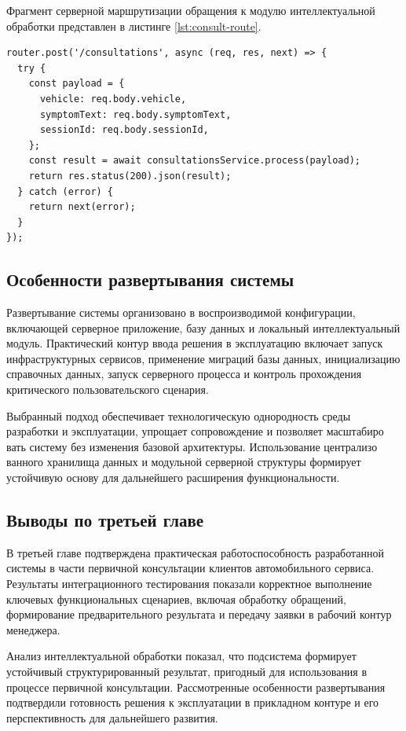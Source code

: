 \documentclass[14pt,a4paper]{extarticle}
\numberwithin{figure}{section}
\numberwithin{table}{section}
\begin{document}
Фрагмент серверной маршрутизации обращения к модулю интеллектуальной
обработки представлен в листинге \ref{lst:consult-route}.

\begin{lstlisting}[caption={Маршрут обработки запроса первичной консультации},label={lst:consult-route}]
router.post('/consultations', async (req, res, next) => {
  try {
    const payload = {
      vehicle: req.body.vehicle,
      symptomText: req.body.symptomText,
      sessionId: req.body.sessionId,
    };
    const result = await consultationsService.process(payload);
    return res.status(200).json(result);
  } catch (error) {
    return next(error);
  }
});
\end{lstlisting}

\subsection{Особенности развертывания
системы}\label{sec:chapter3-deploy}

Развертывание системы организовано в воспроизводимой конфигурации,
включающей серверное приложение, базу данных и локальный интеллектуальный
модуль. Практический контур ввода решения в эксплуатацию включает запуск
инфраструктурных сервисов, применение миграций базы данных, инициализацию
справочных данных, запуск серверного процесса и контроль прохождения
критического пользовательского сценария.

Выбранный подход обеспечивает технологическую однородность среды
разработки и эксплуатации, упрощает сопровождение и позволяет масштабиро
вать систему без изменения базовой архитектуры. Использование централизо
ванного хранилища данных и модульной серверной структуры формирует
устойчивую основу для дальнейшего расширения функциональности.

\subsection{Выводы по третьей
главе}\label{sec:chapter3-summary}

В третьей главе подтверждена практическая работоспособность разработанной
системы в части первичной консультации клиентов автомобильного сервиса.
Результаты интеграционного тестирования показали корректное выполнение
ключевых функциональных сценариев, включая обработку обращений,
формирование предварительного результата и передачу заявки в рабочий
контур менеджера.

Анализ интеллектуальной обработки показал, что подсистема формирует
устойчивый структурированный результат, пригодный для использования в
процессе первичной консультации. Рассмотренные особенности развертывания
подтвердили готовность решения к эксплуатации в прикладном контуре и его
перспективность для дальнейшего развития.
\end{document}
